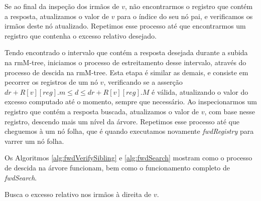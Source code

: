 Se ao final da inspeção dos irmãos de $v$, não encontrarmos o registro que contém a resposta, atualizamos o valor de $v$ para o índice do seu nó pai, e verificamos os irmãos deste nó atualizado. Repetimos esse processo até que  encontrarmos um registro que contenha o excesso relativo desejado.

Tendo encontrado o intervalo que contém a resposta desejada durante a subida na rmM-tree, iniciamos  o processo de estreitamento desse intervalo, através do processo de descida na rmM-tree. Esta etapa é  similar as demais, e consiste em pecorrer os registros de um nó $v$, verificando se a asserção $dr + R[v][reg].m \leq d \leq dr + R[v][reg].M$ é válida, atualizando o valor do excesso computado até o momento, sempre que necessário. Ao inspecionarmos um registro que contém a resposta buscada,  atualizamos o valor de $v$, com base nesse registro, descendo mais um nível da árvore. Repetimos esse processo até que cheguemos à um nó folha, que é quando executamos novamente \textit{fwdRegistry} para varrer um nó folha.

Os Algoritmos \ref{alg:fwdVerifySibling} e \ref{alg:fwdSearch} mostram como o processo de descida na árvore funcionam, bem como o funcionamento completo de \textit{fwdSearch}.


\begin{algorithm}[htp]
    \caption{Busca o excesso relativo nos irmãos à direita de $v$.}
    \label{alg:fwdVerifySibling}
\end{algorithm}


